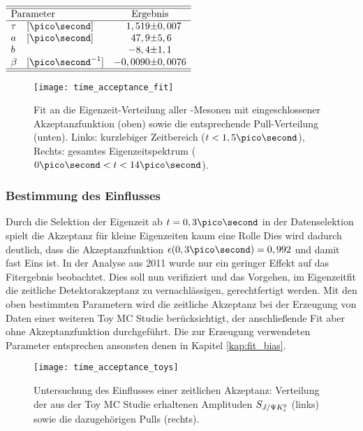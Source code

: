 \begin{table}[hptb]
\centering
\caption{Ergebnis des Fits zur Bestimmung der zeitlichen Akzeptanz. $\tau$ wurde auf den PDG-Wert $\tau = (1,519 \pm 0,007)\pico\second$ \cite{pdg-tau} gaußisch eingeschränkt.}
\label{tab:fit_akzeptanz}
$\begin{array}{llr@{\pm}l}
\hline \hline 
\multicolumn{2}{l}{\text{Parameter}} & \multicolumn{2}{c}{\text{Ergebnis}}  \\ \hline
\tau  & [\ps]  &  1,519 & 0,007 \\
a   & [\ps]  &  47,9    & 5,6 \\
b   & &  -8,4    & 1,1 \\
\beta & [\ps^{-1}]  & -0,0090 & 0,0076 \\ 
\hline \hline
\end{array}$
\end{table}
\begin{figure}[hptb]
\centering
\texttt{[image: time\_acceptance\_fit]}
\caption{Fit an die Eigenzeit-Verteilung aller \Bd-Mesonen mit eingeschlossener Akzeptanzfunktion (oben) sowie die entsprechende Pull-Verteilung (unten). Links: kurzlebiger Zeitbereich ($t<1,5\pico\second$), Rechts: gesamtes Eigenzeitspektrum ($0\ps < t < 14\ps$).}
\label{fig:fit_akzeptanz}
\end{figure}

\subsubsection{Bestimmung des Einflusses}
Durch die Selektion der Eigenzeit ab $t = 0,3\ps$ in der Datenselektion spielt die Akzeptanz für kleine Eigenzeiten kaum eine Rolle Dies wird dadurch deutlich, dass die Akzeptanzfunktion $\epsilon(0,3\ps) = 0,992$ und damit fast Eins ist. In der Analyse aus 2011 \cite{lhcb-paper} wurde nur ein geringer Effekt auf das Fitergebnis beobachtet. Dies soll nun verifiziert und das Vorgehen, im Eigenzeitfit die zeitliche Detektorakzeptanz zu vernachlässigen, gerechtfertigt werden. Mit den oben bestimmten Parametern wird die zeitliche Akzeptanz bei der Erzeugung von Daten einer weiteren Toy MC Studie berücksichtigt, der anschließende Fit aber ohne Akzeptanzfunktion durchgeführt. Die zur Erzeugung verwendeten Parameter entsprechen ansonsten denen in Kapitel \ref{kap:fit_bias}.
\begin{figure}[hptb]
\centering
\texttt{[image: time\_acceptance\_toys]}
\caption{Untersuchung des Einflusses einer zeitlichen Akzeptanz: Verteilung der aus der Toy MC Studie erhaltenen Amplituden $S_{J/\Psi K_s^0}$ (links) sowie die dazugehörigen Pulls (rechts).}
\label{fig:toys_acceptance}
\end{figure}

